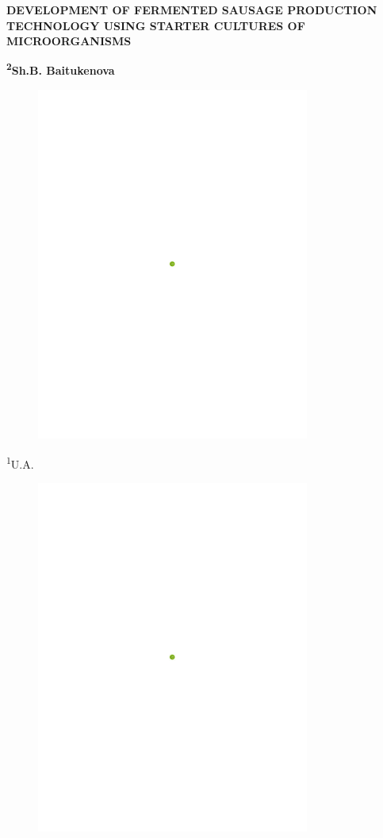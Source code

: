 
{\bfseries DEVELOPMENT OF FERMENTED SAUSAGE PRODUCTION TECHNOLOGY USING
STARTER CULTURES OF MICROORGANISMS}

{\bfseries \textsuperscript{2}Sh.B. Baitukenova}
\begin{figure}[H]
	\centering
	\includegraphics[width=0.8\textwidth]{media/pish/image1}
	\caption*{}
\end{figure}

\textsuperscript{1}U.A.
\begin{figure}[H]
	\centering
	\includegraphics[width=0.8\textwidth]{media/pish/image2}
	\caption*{}
\end{figure}

